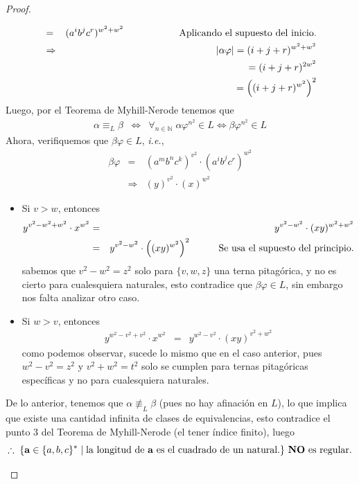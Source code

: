 \documentclass{article}
\begin{document}
\begin{enumerate}
\begin{proof}
\begin{itemize}
\begin{eqnarray*}
        &=& (a^{i}b^{j}c^{r})^{w^2 + w^2}
        \hspace*{2cm} \text{Aplicando el supuesto del inicio.}\\
        &\Rightarrow& |\alpha \varphi| = (i + j + r)^{w^2 + w^2}\\
        & & \hspace*{0.75cm} = (i + j + r)^{2w^2}\\
        & & \hspace*{0.75cm} = \left((i + j + r)^{w^2}\right)^{2}
      \end{eqnarray*}
      Luego, por el Teorema de Myhill-Nerode tenemos que
      \begin{eqnarray*}
      \alpha \equiv_{L} \beta &\Leftrightarrow& \forall_{n \in \mathbb{N}}\; \alpha \varphi^{n^2} \in L
      \Leftrightarrow \beta \varphi^{n^2} \in L
      \end{eqnarray*}
      Ahora, verifiquemos que $\beta \varphi \in L$, \textit{i.e.},
      \begin{eqnarray*}
        \beta \varphi &=& (a^{m}b^{n}c^{k})^{v^2} \cdot (a^{i}b^{j}c^{r})^{w^2}\\
        &\Rightarrow& (y)^{v^2} \cdot (x)^{w^2} 
      \end{eqnarray*}
      \begin{itemize}
      \item Si $v > w$, entonces
        \begin{eqnarray*}
          y^{v^2 - w^2 + w^2} \cdot x^{w^2} &=& y^{v^2 - w^2} \cdot (xy)^{w^2 + w^2}\\
          &=& y^{v^2 - w^2} \cdot \left((xy)^{w^2}\right)^2 \hspace*{1cm} \text{Se usa el supuesto del principio.}
        \end{eqnarray*}
        sabemos que $v^2 - w^2 = z^2$ solo para $\{v,w,z\}$ una terna pitagórica, y no es
        cierto para cualesquiera naturales, esto contradice que $\beta \varphi \in L$, sin
        embargo nos falta analizar otro caso.
      \item Si $w > v$, entonces
        \begin{eqnarray*}
          y^{w^2 - v^2 + v^2} \cdot x^{w^2} &=& y^{w^2 - v^2} \cdot (xy)^{v^2 + w^2}
        \end{eqnarray*}
        como podemos observar, sucede lo mismo que en el caso anterior, pues
        $w^2 - v^2 = z^2$ y $v^2 + w^2 = t^2$ solo se cumplen para ternas pitagóricas específicas
        y no para cualesquiera naturales.
      \end{itemize}
      De lo anterior, tenemos que $\alpha \not \equiv_{L} \beta$ (pues no hay afinación en $L$),
      lo que implica que existe una cantidad infinita de clases de equivalencias, esto contradice
      el punto $3$ del Teorema de Myhill-Nerode (el tener índice finito), luego
      \[
      \therefore\; \{\mathbf{a} \in \{a, b, c\}^{*}\; |\; \text{la longitud de $\mathbf{a}$
        es el cuadrado de un natural.}\} \text{ \textbf{NO} es regular}.
      \]
    \end{itemize}
    

\end{proof}
\end{enumerate}
\end{document}
